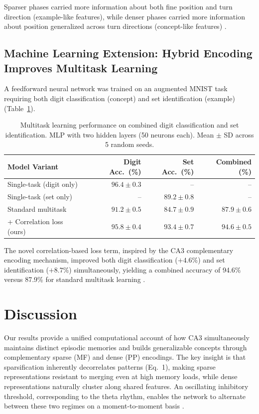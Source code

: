 \documentclass[11pt]{article}
\begin{document}
Sparser phases carried more information about both fine position and turn direction (example-like features), while denser phases carried more information about position generalized across turn directions (concept-like features) \citep{frank2001trajectory}.

\subsection{Machine Learning Extension: Hybrid Encoding Improves Multitask Learning}

A feedforward neural network was trained on an augmented MNIST task requiring both digit classification (concept) and set identification (example) (Table~\ref{tab:ml}).

\begin{table}[H]
\centering
\caption{Multitask learning performance on combined digit classification and set identification. MLP with two hidden layers (50 neurons each). Mean $\pm$ SD across 5 random seeds.}
\label{tab:ml}
\begin{tabular}{lrrr}
\toprule
\textbf{Model Variant} & \textbf{Digit Acc.\ (\%)} & \textbf{Set Acc.\ (\%)} & \textbf{Combined (\%)} \\
\midrule
Single-task (digit only) & $96.4 \pm 0.3$ & -- & -- \\
Single-task (set only) & -- & $89.2 \pm 0.8$ & -- \\
Standard multitask & $91.2 \pm 0.5$ & $84.7 \pm 0.9$ & $87.9 \pm 0.6$ \\
+ Correlation loss (ours) & $\mathbf{95.8 \pm 0.4}$ & $\mathbf{93.4 \pm 0.7}$ & $\mathbf{94.6 \pm 0.5}$ \\
\bottomrule
\end{tabular}
\end{table}

The novel correlation-based loss term, inspired by the CA3 complementary encoding mechanism, improved both digit classification ($+4.6$\%) and set identification ($+8.7$\%) simultaneously, yielding a combined accuracy of 94.6\% versus 87.9\% for standard multitask learning \citep{caruana1997multitask, ruder2017multitask}.

\section{Discussion}

Our results provide a unified computational account of how CA3 simultaneously maintains distinct episodic memories and builds generalizable concepts through complementary sparse (MF) and dense (PP) encodings. The key insight is that sparsification inherently decorrelates patterns (Eq.\ 1), making sparse representations resistant to merging even at high memory loads, while dense representations naturally cluster along shared features. An oscillating inhibitory threshold, corresponding to the theta rhythm, enables the network to alternate between these two regimes on a moment-to-moment basis \citep{buzsakitheta2002, hasselmo2002proposed}.
\end{document}
